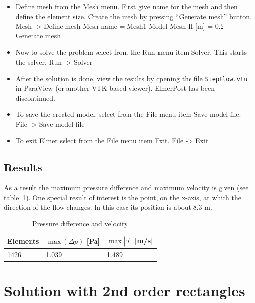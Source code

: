 \begin{itemize}
\ttend
\item Define mesh from the Mesh menu. First give name for 
the mesh and then define the element size. Create the mesh by pressing
``Generate mesh'' button. 
\ttbegin
Mesh -> Define mesh 
  Mesh name = Mesh1 
  Model Mesh H [m] = 0.2 
  Generate mesh
\ttend
\item Now to solve the problem select from the Run menu item Solver. This 
starts the solver. 
\ttbegin
Run -> Solver 
\ttend
\item After the solution is done, view the results by opening the file
{\tt StepFlow.vtu} in ParaView (or another VTK-based viewer). ElmerPost has
been discontinued.
\item To save the created model, select from the File menu item Save 
model file. 
\ttbegin
File -> Save model file 
\ttend
\item To exit Elmer select from the File menu item Exit. 
\ttbegin
File -> Exit
\ttend
\end{itemize}

\subsection*{Results}

As a result the maximum pressure difference and maximum velocity is 
given (see table~\ref{tb:struct2}). One special result of interest 
is the point, on the x-axis, at which the direction of the flow changes. 
In this case its position is about 8.3 m. 
   
\begin{table}[h]
\caption{Pressure difference and velocity}
\label{tb:struct2}
\begin{center}
\begin{tabular}{lll} \hline
Elements & $\max (\Delta p)$ [Pa] & $\max |\vec{u}|$ [m/s] \\ \hline
1426  & 1.039  & 1.489 \\ \hline
\end{tabular}
\end{center}
\end{table}



\section{Solution with 2nd order rectangles}


